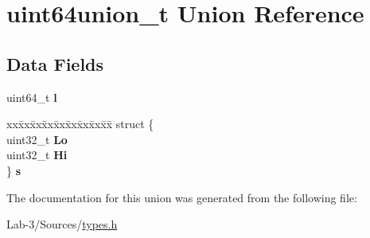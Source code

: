 \hypertarget{unionuint64union__t}{}\section{uint64union\+\_\+t Union Reference}
\label{unionuint64union__t}
\subsection*{Data Fields}
\begin{DoxyCompactItemize}
\item 
\mbox{\label{unionuint64union__t_ad873e50da4d1b0ffbf26c172cb8133c5}} 
uint64\+\_\+t {\bfseries l}
\item 
\mbox{\label{unionuint64union__t_ac18bcbf8849b109e698ff289f2bcf858}} 
\begin{tabbing}
xx\=xx\=xx\=xx\=xx\=xx\=xx\=xx\=xx\=\kill
struct \{\\
\>uint32\_t {\bfseries Lo}\\
\>uint32\_t {\bfseries Hi}\\
\} {\bfseries s}\\

\end{tabbing}\end{DoxyCompactItemize}


The documentation for this union was generated from the following file\+:\begin{DoxyCompactItemize}
\item 
Lab-\/3/\+Sources/\hyperlink{types_8h}{types.\+h}\end{DoxyCompactItemize}
